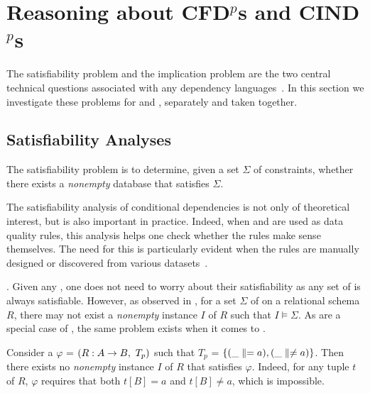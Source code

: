 \section{Reasoning about CFD$^p$s and CIND$^p$s}
\label{sec-reasoning}

The satisfiability problem and the implication problem are the two
central technical questions associated with any dependency languages~\cite{AbHuVi1995,CFDs,tcs-CINDs}.
In this section we investigate these
problems for \pCFDs and \pCINDs, separately and taken together.

\vspace{-1ex}
\subsection{Satisfiability Analyses}

The satisfiability problem is to determine, given a set $\Sigma$ of
constraints, whether there exists a {\em nonempty} database that
satisfies $\Sigma$.

The satisfiability analysis of conditional dependencies is not only
of theoretical interest, but is also important in practice. Indeed,
when \pCFDs and \pCINDs are used as data quality rules, this
analysis helps one check whether the rules make sense themselves.
The need for this is particularly evident when the rules are
manually designed or discovered from various
datasets~\cite{CM08,divesh08,icde09}.

. Given any
\FDs, one does not need to worry about their satisfiability
as any set of \FDs is always satisfiable. However, as observed
in \cite{CFDs}, for a set $\Sigma$ of \CFDs on a relational schema
$R$, there may not exist a {\em nonempty} instance $I$ of $R$ such
that $I\models\Sigma$. As \CFDs are a special case of \pCFDs, the
same problem exists when it comes to \pCFDs.

\vspace{-0.5ex}
\begin{example}
\label{exam-sat-cfd} Consider a \pCFD $\varphi$ = $(R: A\rightarrow
B,\ T_p)$ such that $T_p$ = $\{(\_\parallel = a), (\_ \parallel \ne a)\}$.
Then there exists no {\em nonempty} instance $I$ of $R$ that
satisfies $\varphi$. Indeed, for any tuple $t$ of $R$,
$\varphi$ requires that both $t[B] = a$ and
$t[B]\ne a$, which is impossible.
\end{example}
\vspace{-0.5ex}

